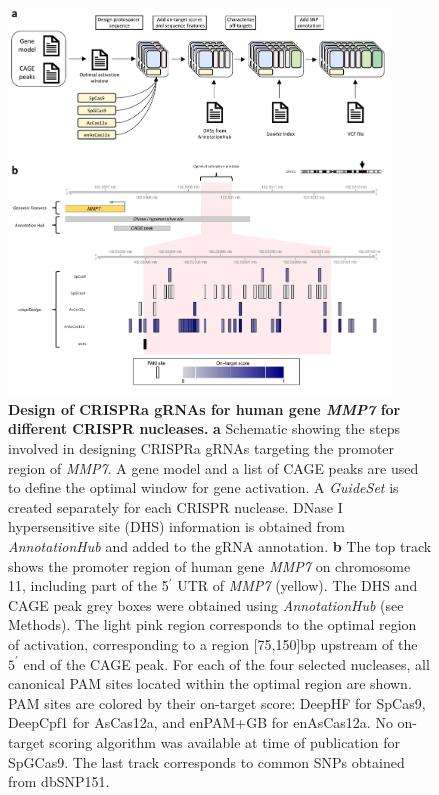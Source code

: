 \documentclass[pdftex,english,10pt]{article}
\begin{document}
{%
\begin{figure}
\centering
\includegraphics[width=0.9\textwidth]{Figure6.pdf}
  \caption{\textbf{Design of CRISPRa gRNAs for human gene \textit{MMP7} for different CRISPR nucleases.} 
  \textbf{a} Schematic showing the steps involved in designing CRISPRa gRNAs targeting the promoter region of \textit{MMP7}.
A gene model and a list of CAGE peaks are used to define the optimal window for gene activation. 
A \textit{GuideSet} is created separately for each CRISPR nuclease.
DNase I hypersensitive site (DHS) information is obtained from \textit{AnnotationHub} and added to the gRNA annotation.
\textbf{b} The top track shows the promoter region of human gene \textit{MMP7} on chromosome 11, including part of the 5$^\prime$ UTR of \textit{MMP7} (yellow). 
The DHS and CAGE peak grey boxes were obtained using \textit{AnnotationHub} (see Methods). 
The light pink region corresponds to the optimal region of activation, corresponding to a region [75,150]bp upstream of the  $5^\prime$ end of the CAGE peak. For each of the four selected nucleases, all canonical PAM sites located within the optimal region are shown. PAM sites are colored by their on-target score: DeepHF for SpCas9, DeepCpf1 for AsCas12a, and enPAM+GB for enAsCas12a. No on-target scoring algorithm was available at time of publication for SpGCas9. The last track corresponds to common SNPs obtained from dbSNP151. 
  }
  \label{fig:crispra}
\end{figure}


}
\end{document}
